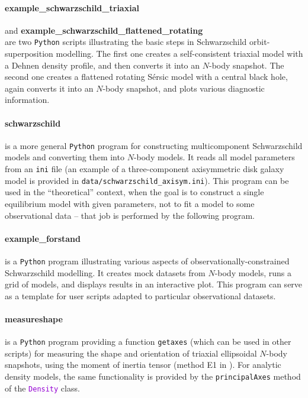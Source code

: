 \documentclass[12pt]{article}
\newcommand{\Python}{\texttt{Python}\xspace}
\newcommand{\ttt}[1]{\textcolor{darkviolet}{\texttt{#1}}}
\let\oldparagraph\paragraph
\renewcommand{\paragraph}[1]{\vspace{-2mm}\oldparagraph{#1}}
\begin{document}
\paragraph{example_schwarzschild_triaxial} and \;\;\textbf{example_schwarzschild_flattened_rotating}\;\;\\ are two \Python scripts illustrating the basic steps in Schwarzschild orbit-superposition  modelling. The first one creates a self-consistent triaxial model with a Dehnen density profile, and then converts it into an $N$-body snapshot. The second one creates a flattened rotating S\'ersic model with a central black hole, again converts it into an $N$-body snapshot, and plots various diagnostic information.

\paragraph{schwarzschild} is a more general \Python program for constructing multicomponent Schwarzschild models and converting them into $N$-body models. It reads all model parameters from an \texttt{ini} file (an example of a three-component axisymmetric disk galaxy model is provided in \texttt{data/schwarzschild_axisym.ini}). This program can be used in the ``theoretical'' context, when the goal is to construct a single equilibrium model with given parameters, not to fit a model to some observational data -- that job is performed by the following program.

\paragraph{example_forstand} is a \Python program illustrating various aspects of observationally-constrained Schwarzschild modelling. It creates mock datasets from $N$-body models, runs a grid of models, and displays results in an interactive plot. This program can serve as a template for user scripts adapted to particular observational datasets.

\paragraph{measureshape} is a \Python program providing a function \texttt{getaxes} (which can be used in other scripts) for measuring the shape and orientation of triaxial ellipsoidal $N$-body snapshots, using the moment of inertia tensor (method E1 in \cite{Zemp2011}). For analytic density models, the same functionality is provided by the \texttt{principalAxes} method of the \ttt{Density} class.
\end{document}
